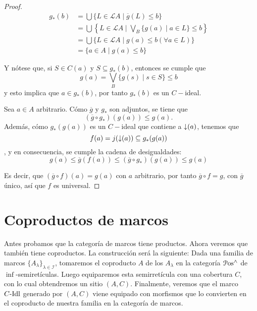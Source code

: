 \begin{proof}
    \begin{align*}
        g_*(b) & = \bigcup\{L\in\mathcal{L}A\mid\overline{g}(L)\leq b\} \\
               & = \bigcup\left\{L\in\mathcal{L}A\mid \bigvee_B\{g(a)\mid a\in L\}\leq b\right\} \\
               & = \bigcup\{L\in\mathcal{L}A\mid g(a)\leq b (\forall a \in L)\} \\
               & = \{a\in A\mid g(a)\leq b\} 
    \end{align*}

    Y nótese que, si $S\in C(a)$ y $S\subseteq g_*(b)$, entonces se cumple que
    \begin{equation*}
        g(a)= \bigvee_B\{g(s)\mid s\in S\}\leq b
    \end{equation*}
    y esto implica que $a\in g_*(b)$, por tanto $g_*(b)$ es un $C-$ideal. 

    Sea $a\in A$ arbitrario. Cómo $\overline{g}$ y $g_*$ son adjuntos, se tiene que
    \begin{equation*}
        (\overline{g}\circ g_*)(g(a))\leq g(a).
    \end{equation*}
    Además, cómo $g_*(g(a))$ es un $C-$ideal que contiene a ${\downarrow}(a)$, tenemos que $$f(a)=j({\downarrow}(a))\subseteq g_*(g(a))$$, y en consecuencia, se cumple la cadena de desigualdades:
    \begin{equation*}
        g(a)\leq\overline{g}(f(a))\leq(\overline{g}\circ g_*)(g(a))\leq g(a)
    \end{equation*}

    Es decir, que $(\overline{g}\circ f)(a)=g(a)$
    con $a$ arbitrario,
    por tanto $\overline{g}\circ f = g$,
    con $\overline{g}$ único, así que $f$ es universal.
\end{proof}

\section{Coproductos de marcos}

Antes probamos que la categoría de marcos tiene productos.
Ahora veremos que también tiene coproductos.
La construcción será la siguiente:
Dada una familia de marcos $\{A_\lambda\}_{\lambda\in\mathscr I}$,
tomaremos el coproducto $A$ de los $A_\lambda$
en la categoría $\mathcal{P}\mathrm{os}^{\wedge}$ de $\inf$-semiretículas. Luego
equiparemos esta semirretícula con una cobertura $C$, con lo cual
obtendremos un sitio $(A,C)$.
Finalmente, veremos que el marco $C\text{-}\mathrm{Idl}$ generado por $(A,C)$
viene equipado con morfismos que lo convierten en el coproducto
de nuestra familia en la categoría de marcos.

